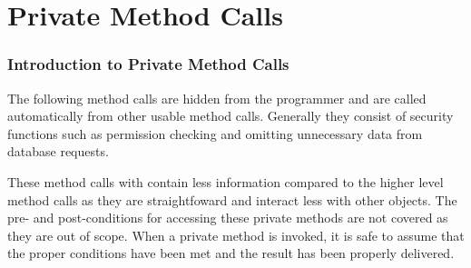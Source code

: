 \documentclass[letterpaper,12pt]{report}
\begin{document}
\begin{comment}
  \newline
  \hspace*{0.5cm}<h3>Notes</h3>\linebreak
  \hspace*{1cm}<p>Notes go here</p>\linebreak
  \newline
  \hspace*{0.5cm}<h3>Pre-Condition</h3>\linebreak
  \hspace*{1cm}<p>Pre conditions go here</p>\linebreak
  \newline
  \hspace*{0.5cm}<h3>Post-Conditions</h3>\linebreak
  \hspace*{1cm}<p>Post conditions go here</p>\linebreak
  \newline
  \hspace*{0.5cm}<h3>Errors</h3>\linebreak
  \hspace*{1cm}<p>Errors go here</p>\linebreak
  \newline
  \hspace*{0.5cm}<h3>Related Methods</h3>\linebreak
  \hspace*{1cm}<p><a href="\#">Related Method 1 Link</a></p>\linebreak }
\end{comment}


{
\part{Private Method Calls}
  \pagebreak
  \section*{Introduction to Private Method Calls}
  \par \noindent
    \hspace*{1cm} The following method calls are hidden from the programmer and are called automatically from other usable method calls. Generally they consist of security functions such as permission checking and omitting unnecessary data from database requests.
    \par These method calls with contain less information compared to the higher level method calls as they are straightfoward and interact less with other objects. The pre- and post-conditions for accessing these private methods are not covered as they are out of scope. When a private method is invoked, it is safe to assume that the proper conditions have been met and the result has been properly delivered.

}
\end{document}
